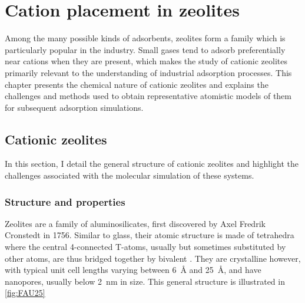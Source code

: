 \documentclass[main.tex]{subfiles}
\begin{document}
\chapter{Cation placement in zeolites}\label{cationzeolites}
\clearpage

Among the many possible kinds of adsorbents, zeolites form a family which is particularly popular in the industry. Small gases tend to adsorb preferentially near cations when they are present, which makes the study of cationic zeolites primarily relevant to the understanding of industrial adsorption processes. This chapter presents the chemical nature of cationic zeolites and explains the challenges and methods used to obtain representative atomistic models of them for subsequent adsorption simulations.%

\section{Cationic zeolites}

In this section, I detail the general structure of cationic zeolites and highlight the challenges associated with the molecular simulation of these systems.

\subsection{Structure and properties}

Zeolites are a family of aluminosilicates, first discovered by Axel Fredrik Cronstedt in 1756. Similar to glass, their atomic structure is made of tetrahedra  where the central 4-connected T-atoms, usually  but sometimes substituted by other atoms, are thus bridged together by bivalent . They are crystalline however, with typical unit cell lengths varying between \qty{6}{\angstrom} and \qty{25}{\angstrom}, and have nanopores, usually below \qty{2}{nm} in size. This general structure is illustrated in \cref{fig:FAU25}
\end{document}
